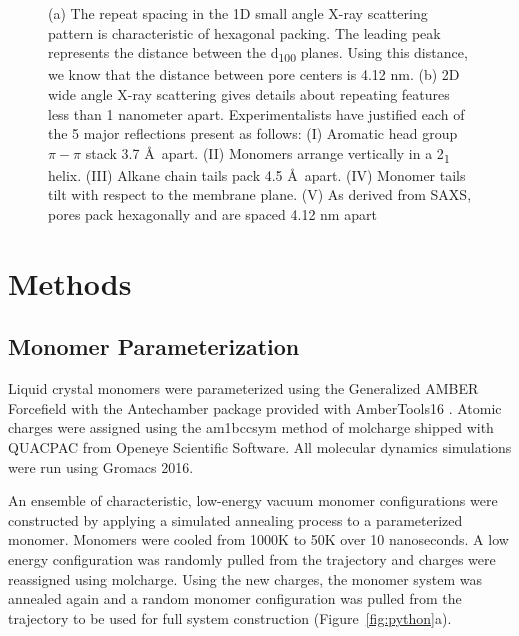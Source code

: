 \documentclass{article}
\begin{document}
\begin{figure}
\begin{subfigure}[t]{0.47\linewidth}
                \caption{}\label{fig:WAXS}
        \end{subfigure}
	\caption{(a) The repeat spacing in the 1D small angle X-ray scattering pattern
		is characteristic of hexagonal packing. The leading peak represents the
		distance between the d\textsubscript{100} planes. Using this distance, we know
		that the distance between pore centers is 4.12 nm. (b) 2D wide angle X-ray
		scattering gives details about repeating features less than 1 nanometer
		apart. Experimentalists have justified each of the 5 major reflections
		present as follows: (I) Aromatic head group $\pi-\pi$ stack 3.7 \AA~apart.
		(II) Monomers arrange vertically in a 2\textsubscript{1} helix. (III) Alkane
 		chain tails pack 4.5 \AA~apart. (IV) Monomer tails tilt with respect to the 
 		membrane plane. (V) As derived from SAXS, pores pack hexagonally and are 
		spaced 4.12 nm apart}
	\label{fig:SWAXS}
 \end{figure}

  \section{Methods}
 
  \subsection{Monomer Parameterization}

  Liquid crystal monomers were parameterized using the Generalized AMBER
  Forcefield \cite{wang_development_2004} with the Antechamber package
  \cite{wang_automatic_2006} provided with AmberTools16
  \cite{case_ambertools16_2016}. Atomic charges were assigned using the am1bccsym
  method of molcharge shipped with QUACPAC from Openeye Scientific Software. All
  molecular dynamics simulations were run using Gromacs 2016.
  \cite{bekker_gromacs:_1993,berendsen_gromacs:_1995,van_der_spoel_gromacs:_2005,hess_gromacs_2008}

  An ensemble of characteristic, low-energy vacuum monomer configurations
  were constructed by applying a simulated annealing process to a parameterized
  monomer. Monomers were cooled from 1000K to 50K over 10 nanoseconds.  A low
  energy configuration was randomly pulled from the trajectory and charges were
  reassigned using molcharge.  Using the new charges, the monomer system was
  annealed again and a random monomer configuration was pulled from the
  trajectory to be used for full system construction (Figure~\ref{fig:python}a).
\end{document}
